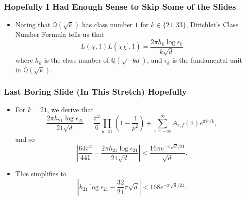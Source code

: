 \documentclass[handout]{beamer}
\begin{document}
\begin{frame}

	\frametitle{Hopefully I Had Enough Sense to Skip Some of the Slides}

	\begin{itemize}

		\item Noting that $\mathbb{Q}(\sqrt{k})$ has class number $1$ for $k \in \{21, 33\}$, Dirichlet's Class Number Formula tells us that
			\[
				L(\chi, 1) L(\chi \chi^\prime, 1) = \frac{2 \pi h_k \log \epsilon_k}{k \sqrt{d}}
			\]
			where $h_k$ is the class number of $\mathbb{Q}(\sqrt{-kd})$, and $\epsilon_k$ is the fundamental unit in $\mathbb{Q}(\sqrt{k})$.


	\end{itemize}

\end{frame}

\begin{frame}

	\frametitle{Last Boring Slide (In This Stretch) Hopefully}

	\begin{itemize}
		
		\item For $k = 21$, we derive that 
			\[
				\frac{2 \pi h_{21} \log \epsilon_{21}}{21 \sqrt{d}} = \frac{\pi^2}{6} \prod_{p \mid 21} \left(1 - \frac{1}{p^2} \right) + \sum_{r = -\infty}^{\infty} A_{r, f}(1) e^{\pi i r / k},
			\]
			and so
			\[
				\left| \frac{64 \pi^2}{441} - \frac{2 \pi h_{21} \log \epsilon_{21}}{21 \sqrt{d}} \right| < \frac{16 \pi e^{-\pi \sqrt{d} / 21}}{\sqrt{d}}.
			\]
			\pause

		\item This simplifies to
			\[
				\left| h_{21} \log \epsilon_{21} - \frac{32}{21} \pi \sqrt{d} \right| < 168 e^{-\pi \sqrt{d} / 21}.
			\]
	\end{itemize}

\end{frame}
\end{document}
